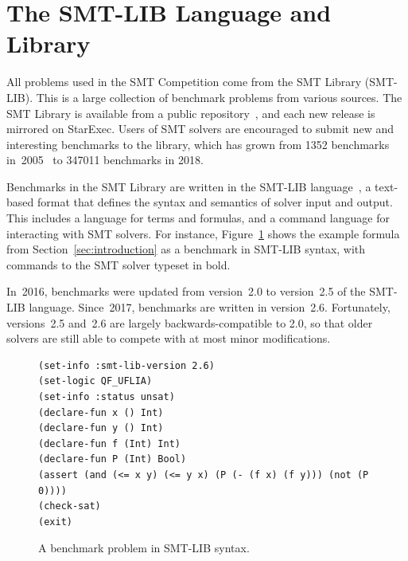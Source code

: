 \documentclass[dvipsnames,table,twoside,11pt]{article}
\begin{document}

\section{The SMT-LIB Language and Library}
\label{sec:smtlib}

All problems used in the SMT Competition come from the SMT Library
(SMT-LIB).  This is a large collection of benchmark problems from
various sources.  The SMT Library is available from a public
repository~\cite{smtlib-repository}, and each new release is mirrored
on StarExec.  Users of SMT solvers are encouraged to submit new and
interesting benchmarks to the library, which has grown from \num{1352}
benchmarks in~2005~\cite{BdMS05} to \num{347011} benchmarks in 2018.

Benchmarks in the SMT Library are written in the SMT-LIB
language~\cite{BarFT-RR-17}, a text-based format that defines the
syntax and semantics of solver input and output.  This includes a
language for terms and formulas, and a command language for
interacting with SMT solvers.  For instance,
Figure~\ref{fig:smtlib-example} shows the example formula from
Section~\ref{sec:introduction} as a benchmark in SMT-LIB syntax, with
commands to the SMT solver typeset in bold.

In~2016, benchmarks were updated from version~2.0 to version~2.5 of
the SMT-LIB language.  Since~2017, benchmarks are written in
version~2.6.  Fortunately, versions~2.5 and~2.6 are largely
backwards-compatible to 2.0, so that older solvers are still able to
compete with at most minor modifications.

\begin{figure}
\begin{lstlisting}
(set-info :smt-lib-version 2.6)
(set-logic QF_UFLIA)
(set-info :status unsat)
(declare-fun x () Int)
(declare-fun y () Int)
(declare-fun f (Int) Int)
(declare-fun P (Int) Bool)
(assert (and (<= x y) (<= y x) (P (- (f x) (f y))) (not (P 0))))
(check-sat)
(exit)
\end{lstlisting}
\caption{A benchmark problem in SMT-LIB syntax.}
\label{fig:smtlib-example}
\end{figure}
\end{document}
